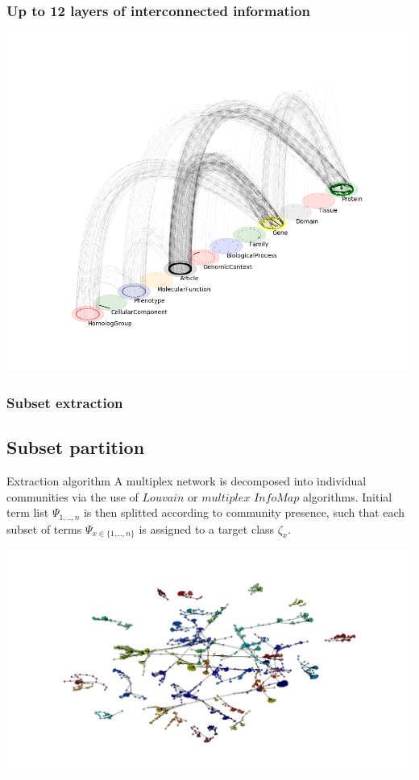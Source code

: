 \documentclass{beamer}
\begin{document}
\begin{frame}\frametitle{Up to 12 layers of interconnected information}  
  \includegraphics[scale=0.42]{images/SNPmpx}    
\end{frame}

\begin{frame}\frametitle{Subset extraction}
  \subsection{Subset partition}
  \begin{block}{Extraction algorithm}
    A multiplex network is decomposed into individual communities via the use of $Louvain$ or $multiplex$ $InfoMap$ algorithms. Initial term list $\Psi_{1,..,n} $ is then splitted according to community presence, such that each subset of terms $ \Psi_{x \in \{1,..,n\}} $ is assigned to a target class $ \zeta_{x} $.
  \end{block}
  \begin{center}
 \includegraphics[scale=0.15]{images/biomine_community}
  \end{center}

\end{frame}
\end{document}
